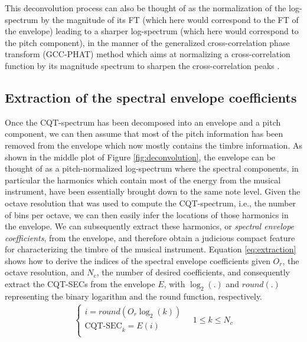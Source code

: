 \documentclass[journal]{IEEEtran}
\begin{document}
This deconvolution process can also be thought of as the normalization of the log-spectrum by the magnitude of its FT (which here would correspond to the FT of the envelope) leading to a sharper log-spectrum (which here would correspond to the pitch component), in the manner of the generalized cross-correlation phase transform (GCC-PHAT) method which aims at normalizing a cross-correlation function by its magnitude spectrum to sharpen the cross-correlation peaks \cite{knapp1976}.


\subsection{Extraction of the spectral envelope coefficients}

Once the CQT-spectrum has been decomposed into an envelope and a pitch component, we can then assume that most of the pitch information has been removed from the envelope which now mostly contains the timbre information. As shown in the middle plot of Figure \ref{fig:deconvolution}, the envelope can be thought of as a pitch-normalized log-spectrum where the spectral components, in particular the harmonics which contain most of the energy from the musical instrument, have been essentially brought down to the same note level. Given the octave resolution that was used to compute the CQT-spectrum, i.e., the number of bins per octave, we can then easily infer the locations of those harmonics in the envelope. We can subsequently extract these harmonics, or \textit{spectral envelope coefficients}, from the envelope, and therefore obtain a judicious compact feature for characterizing the timbre of the musical instrument. Equation \ref{eq:extraction} shows how to derive the indices of the spectral envelope coefficients given $O_r$, the octave resolution, and $N_c$, the number of desired coefficients, and consequently extract the CQT-SECs from the envelope $E$, with $\log_2(.)$ and $round(.)$ representing the binary logarithm and the round function, respectively.
\begin{equation}
\label{eq:extraction}
\begin{split}
\begin{cases}
i = round(O_r \log_2(k)) \\
\text{CQT-SEC}_k = E(i) \\
\end{cases}
\quad 1 \le k \le N_c
\end{split}
\end{equation}
\end{document}
